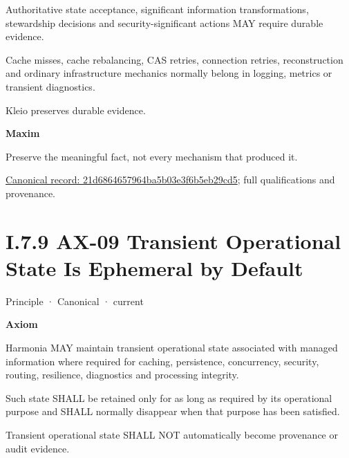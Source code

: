 Authoritative state acceptance, significant information transformations,
stewardship decisions and security-significant actions MAY require
durable evidence.



Cache misses, cache rebalancing, CAS retries, connection retries,
reconstruction and ordinary infrastructure mechanics normally belong in
logging, metrics or transient diagnostics.



Kleio preserves durable evidence.



\par\medskip\textbf{Maxim}\par


Preserve the meaningful fact, not every mechanism that produced it.


{\footnotesize \href{../../../../../../../continuum/motivation/principle/21d6864657964ba5b03e3f6b5eb29cd5.md}{Canonical record: 21d6864657964ba5b03e3f6b5eb29cd5}; full qualifications and provenance.}\par
\section*{I.7.9 AX-09 Transient Operational State Is Ephemeral by Default}
\label{navigation:I.7.9}

\label{element:9a5cb9e8876844e58e660f909f7df9fc}
{\small Principle · Canonical · current}\par

\par\medskip\textbf{Axiom}\par


Harmonia MAY maintain transient operational state associated with
managed information where required for caching, persistence,
concurrency, security, routing, resilience, diagnostics and processing
integrity.



Such state SHALL be retained only for as long as required by its
operational purpose and SHALL normally disappear when that purpose has
been satisfied.



Transient operational state SHALL NOT automatically become provenance or
audit evidence.



